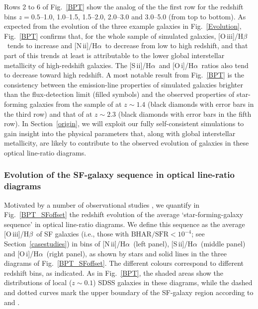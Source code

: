 \documentclass[fleqn,usenatbib]{mnras}
\newcommand{\oiiihb}{\hbox{[O\,{\sc iii}]/H$\beta$}}
\newcommand{\niiha}{\hbox{[N\,{\sc ii}]/H$\alpha$}}
\newcommand{\siiha}{\hbox{[S\,{\sc ii}]/H$\alpha$}}
\newcommand{\oiha}{\hbox{[O\,{\sc i}]/H$\alpha$}}
\begin{document}
Rows 2 to 6 of Fig.~\ref{BPT} show the analog of the the first row for 
the redshift bins $z=0.5$--1.0, 1.0--1.5, 1.5--2.0, 2.0--3.0 and 3.0--5.0
(from top to bottom). As expected from the evolution of the three example
galaxies in Fig.~\ref{Evolution}, Fig.~\ref{BPT} confirms that, for the whole
sample of simulated galaxies, \oiiihb\ tends to increase and \niiha\ to 
decrease from low to high redshift, and that part of this trends at least
is attributable to the lower global interstellar metallicity of
high-redshift galaxies. The \siiha\ and \oiha\ ratios also tend to
decrease toward high redshift. A most notable result from
Fig.~\ref{BPT} is the consistency between the emission-line properties
of simulated galaxies brighter than the flux-detection limit (filled
symbols) and the observed properties of star-forming galaxies from the
sample of \citet{Yabe12} at $z\sim1.4$ (black diamonds with error bars
in the third row) and that of \citet{Steidel14} at $z\sim2.3$ (black
diamonds with error bars in the fifth  row). In Section~\ref{origin},
we will exploit our fully self-consistent simulations  to gain insight
into the physical parameters that, along with global interstellar
metallicity,  are likely to contribute to the observed evolution of
galaxies in these optical line-ratio  diagrams. 

\subsubsection{Evolution of the SF-galaxy sequence in optical line-ratio diagrams}\label{SFsequence}\label{SFseq}

Motivated by a number of observational studies \citep[e.g.,][]{Steidel14,
Shapley15,Kashino17,Strom17}, we quantify in Fig.~\ref{BPT_SFoffset} the 
redshift evolution of the average `star-forming-galaxy sequence' in optical line-ratio
diagrams. We define this sequence as the average \oiiihb\ of SF galaxies
(i.e., those with $\mathrm{BHAR/SFR <10^{-4}}$; see Section~\ref{casestudies}) 
in bins of \niiha\ (left panel), \siiha\ (middle panel) and \oiha\ (right panel), as shown by 
stars and solid lines in the three diagrams of Fig.~\ref{BPT_SFoffset}. The different 
colours correspond to different redshift bins, as indicated. As in Fig.~\ref{BPT}, the 
shaded areas show the distributions of local ($z\sim0.1$) SDSS galaxies in these diagrams, 
while the dashed and dotted curves mark the upper boundary of the SF-galaxy region 
according to \citet{Kauffmann03} and \citet{Kewley01}.
  
\end{document}
